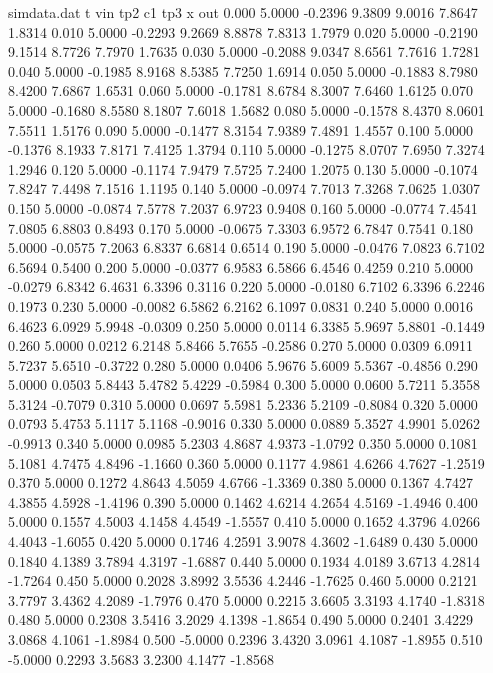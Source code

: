 \begin{filecontents*}{simdata.dat}
t vin tp2 c1 tp3 x out
0.000 5.0000 -0.2396 9.3809 9.0016 7.8647 1.8314
0.010 5.0000 -0.2293 9.2669 8.8878 7.8313 1.7979
0.020 5.0000 -0.2190 9.1514 8.7726 7.7970 1.7635
0.030 5.0000 -0.2088 9.0347 8.6561 7.7616 1.7281
0.040 5.0000 -0.1985 8.9168 8.5385 7.7250 1.6914
0.050 5.0000 -0.1883 8.7980 8.4200 7.6867 1.6531
0.060 5.0000 -0.1781 8.6784 8.3007 7.6460 1.6125
0.070 5.0000 -0.1680 8.5580 8.1807 7.6018 1.5682
0.080 5.0000 -0.1578 8.4370 8.0601 7.5511 1.5176
0.090 5.0000 -0.1477 8.3154 7.9389 7.4891 1.4557
0.100 5.0000 -0.1376 8.1933 7.8171 7.4125 1.3794
0.110 5.0000 -0.1275 8.0707 7.6950 7.3274 1.2946
0.120 5.0000 -0.1174 7.9479 7.5725 7.2400 1.2075
0.130 5.0000 -0.1074 7.8247 7.4498 7.1516 1.1195
0.140 5.0000 -0.0974 7.7013 7.3268 7.0625 1.0307
0.150 5.0000 -0.0874 7.5778 7.2037 6.9723 0.9408
0.160 5.0000 -0.0774 7.4541 7.0805 6.8803 0.8493
0.170 5.0000 -0.0675 7.3303 6.9572 6.7847 0.7541
0.180 5.0000 -0.0575 7.2063 6.8337 6.6814 0.6514
0.190 5.0000 -0.0476 7.0823 6.7102 6.5694 0.5400
0.200 5.0000 -0.0377 6.9583 6.5866 6.4546 0.4259
0.210 5.0000 -0.0279 6.8342 6.4631 6.3396 0.3116
0.220 5.0000 -0.0180 6.7102 6.3396 6.2246 0.1973
0.230 5.0000 -0.0082 6.5862 6.2162 6.1097 0.0831
0.240 5.0000 0.0016 6.4623 6.0929 5.9948 -0.0309
0.250 5.0000 0.0114 6.3385 5.9697 5.8801 -0.1449
0.260 5.0000 0.0212 6.2148 5.8466 5.7655 -0.2586
0.270 5.0000 0.0309 6.0911 5.7237 5.6510 -0.3722
0.280 5.0000 0.0406 5.9676 5.6009 5.5367 -0.4856
0.290 5.0000 0.0503 5.8443 5.4782 5.4229 -0.5984
0.300 5.0000 0.0600 5.7211 5.3558 5.3124 -0.7079
0.310 5.0000 0.0697 5.5981 5.2336 5.2109 -0.8084
0.320 5.0000 0.0793 5.4753 5.1117 5.1168 -0.9016
0.330 5.0000 0.0889 5.3527 4.9901 5.0262 -0.9913
0.340 5.0000 0.0985 5.2303 4.8687 4.9373 -1.0792
0.350 5.0000 0.1081 5.1081 4.7475 4.8496 -1.1660
0.360 5.0000 0.1177 4.9861 4.6266 4.7627 -1.2519
0.370 5.0000 0.1272 4.8643 4.5059 4.6766 -1.3369
0.380 5.0000 0.1367 4.7427 4.3855 4.5928 -1.4196
0.390 5.0000 0.1462 4.6214 4.2654 4.5169 -1.4946
0.400 5.0000 0.1557 4.5003 4.1458 4.4549 -1.5557
0.410 5.0000 0.1652 4.3796 4.0266 4.4043 -1.6055
0.420 5.0000 0.1746 4.2591 3.9078 4.3602 -1.6489
0.430 5.0000 0.1840 4.1389 3.7894 4.3197 -1.6887
0.440 5.0000 0.1934 4.0189 3.6713 4.2814 -1.7264
0.450 5.0000 0.2028 3.8992 3.5536 4.2446 -1.7625
0.460 5.0000 0.2121 3.7797 3.4362 4.2089 -1.7976
0.470 5.0000 0.2215 3.6605 3.3193 4.1740 -1.8318
0.480 5.0000 0.2308 3.5416 3.2029 4.1398 -1.8654
0.490 5.0000 0.2401 3.4229 3.0868 4.1061 -1.8984
0.500 -5.0000 0.2396 3.4320 3.0961 4.1087 -1.8955
0.510 -5.0000 0.2293 3.5683 3.2300 4.1477 -1.8568

\end{filecontents*}
